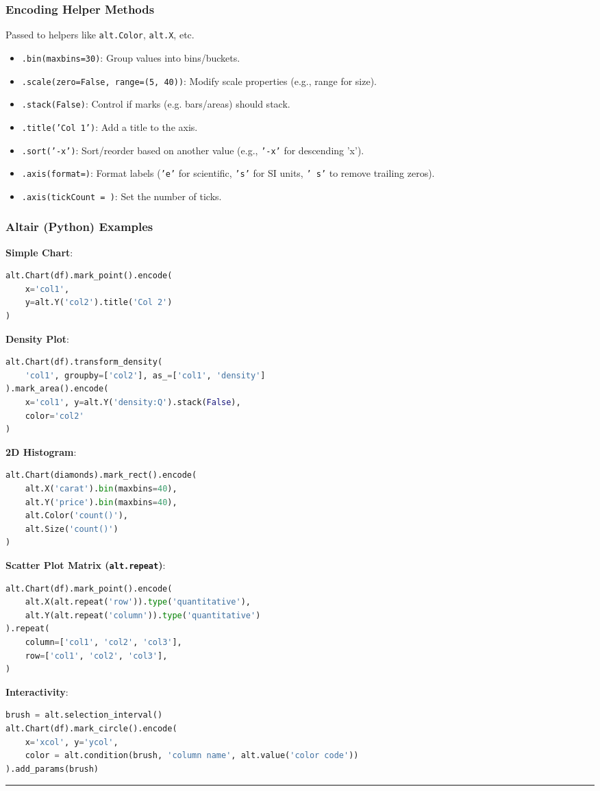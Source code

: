 \documentclass[8pt,landscape]{article}
\newcommand{\code}[1]{\textcolor{myred}{\texttt{#1}}}
\newcommand{\smalltext}[1]{%
  {\fontsize{8}{9}\selectfont\sloppy #1\par}%
}
\begin{document}
\begin{multicols}{3}
\subsubsection*{Encoding Helper Methods}
\smalltext{Passed to helpers like \code{alt.Color}, \code{alt.X}, etc.}
\begin{itemize}
\item \code{.bin(maxbins=30)}: Group values into bins/buckets.
\item \code{.scale(zero=False, range=(5, 40))}: Modify scale properties (e.g., range for size).
\item \code{.stack(False)}: Control if marks (e.g. bars/areas) should stack.
\item \code{.title('Col 1')}: Add a title to the axis.
\item \code{.sort('-x')}: Sort/reorder based on another value (e.g., \code{'-x'} for descending 'x').
\item \code{.axis(format=)}: Format labels (\code{'e'} for scientific, \code{'s'} for SI units, \code{'~s'} to remove trailing zeros).
\item \code{.axis(tickCount = )}: Set the number of ticks.
\end{itemize}

\subsubsection*{Altair (Python) Examples}
\smalltext{\textbf{Simple Chart}:}
\begin{lstlisting}[language=Python]
alt.Chart(df).mark_point().encode(
    x='col1',
    y=alt.Y('col2').title('Col 2')
)
\end{lstlisting}
\smalltext{\textbf{Density Plot}:}
\begin{lstlisting}[language=Python]
alt.Chart(df).transform_density(
    'col1', groupby=['col2'], as_=['col1', 'density']
).mark_area().encode(
    x='col1', y=alt.Y('density:Q').stack(False),
    color='col2'
)
\end{lstlisting}
\smalltext{\textbf{2D Histogram}:}
\begin{lstlisting}[language=Python]
alt.Chart(diamonds).mark_rect().encode(
    alt.X('carat').bin(maxbins=40),
    alt.Y('price').bin(maxbins=40),
    alt.Color('count()'),
    alt.Size('count()')
)
\end{lstlisting}
\smalltext{\textbf{Scatter Plot Matrix (\code{alt.repeat})}:}
\begin{lstlisting}[language=Python]
alt.Chart(df).mark_point().encode(
    alt.X(alt.repeat('row')).type('quantitative'),
    alt.Y(alt.repeat('column')).type('quantitative')
).repeat(
    column=['col1', 'col2', 'col3'],
    row=['col1', 'col2', 'col3'],
)
\end{lstlisting}
\smalltext{\textbf{Interactivity}:}
\begin{lstlisting}[language=Python]
brush = alt.selection_interval()
alt.Chart(df).mark_circle().encode(
    x='xcol', y='ycol',
    color = alt.condition(brush, 'column name', alt.value('color code'))
).add_params(brush)
\end{lstlisting}
\hrule


\end{multicols}
\end{document}
